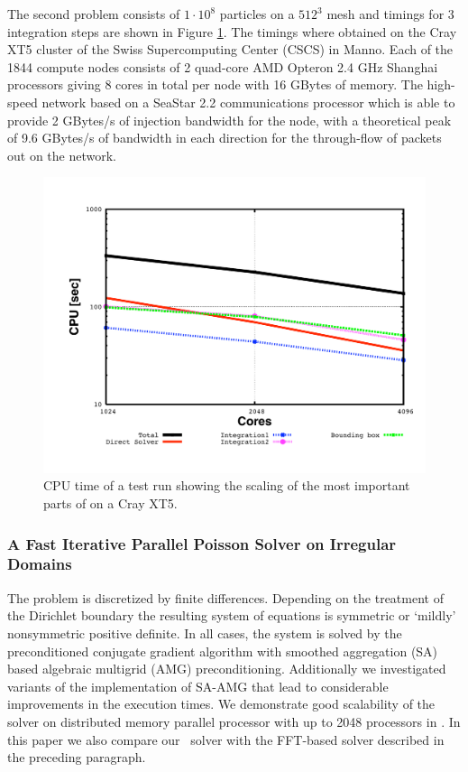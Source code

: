 \documentclass[acus]{JAC2003}
\begin{document}
The second problem consists of $1 \cdot 10^{8}$ particles on a $512^3$ mesh and timings for 3 integration steps are shown in Figure \ref{fig:parperfbig}. 
The timings where obtained on the Cray XT5 cluster of the Swiss Supercomputing Center (CSCS) in Manno.
Each of the 1844 compute nodes consists of 2 quad-core AMD Opteron 2.4 GHz Shanghai processors giving 8 cores in total per node with 16 GBytes of memory. 
The high-speed network based on a SeaStar 2.2 communications processor which is able to provide 2 GBytes/s of injection bandwidth for the node, with a theoretical 
peak of 9.6 GBytes/s of bandwidth in each direction for the through-flow of packets out on the network.
\begin{figure}[htb]
   \centering
  \includegraphics*[scale=0.25]{drift2b}
  \vspace{-5mm}
   \caption{CPU time of a test run showing the scaling of the most important parts of \opalt on a Cray XT5.}
   \label{fig:parperfbig}
\end{figure}

\subsubsection{A Fast Iterative Parallel Poisson Solver on Irregular Domains} 
 The problem is discretized by finite differences.  Depending on the treatment of the
  Dirichlet boundary the resulting system of equations is symmetric or
  `mildly' nonsymmetric positive definite.  In all cases, the system is
  solved by the preconditioned conjugate gradient algorithm with
  smoothed aggregation (SA) based algebraic multigrid (AMG)
  preconditioning.  Additionally we investigated variants of the implementation of
  SA-AMG that lead to considerable improvements in the execution times.
  We demonstrate good scalability of the solver on distributed memory
  parallel processor with up to 2048 processors in \cite{Adelmann:2009p543}. In this paper we also compare our
  \oursolver\ solver with the FFT-based solver described in the preceding paragraph.
  
\end{document}
